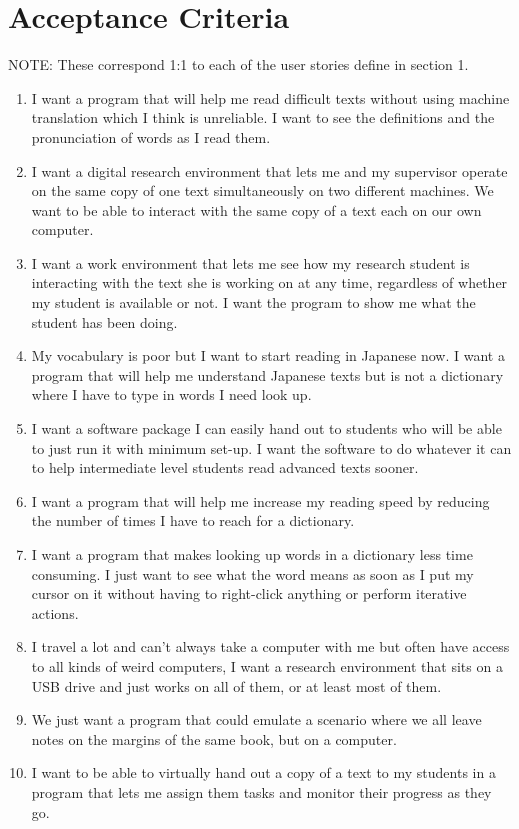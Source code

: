 \documentclass{article}
\begin{document}
\section{Acceptance Criteria}
NOTE: These correspond 1:1 to each of the user stories define in section 1.
\begin{enumerate}
    \item I want a program that will help me read difficult texts without using machine translation which I think is unreliable. I want to see the definitions and the pronunciation of words as I read them.
    \item I want a digital research environment that lets me and my supervisor operate on the same copy of one text simultaneously on two different machines. We want to be able to interact with the same copy of a text each on our own computer.
    \item I want a work environment that lets me see how my research student is interacting with the text she is working on at any time, regardless of whether my student is available or not. I want the program to show me what the student has been doing.
    \item My vocabulary is poor but I want to start reading in Japanese now. I want a program that will help me understand Japanese texts but is not a dictionary where I have to type in words I need look up.
    \item I want a software package I can easily hand out to students who will be able to just run it with minimum set-up. I want the software to do whatever it can to help intermediate level students read advanced texts sooner.
    \item I want a program that will help me increase my reading speed by reducing the number of times I have to reach for a dictionary.
    \item I want a program that makes looking up words in a dictionary less time consuming. I just want to see what the word means as soon as I put my cursor on it without having to right-click anything or perform iterative actions.
    \item I travel a lot and can't always take a computer with me but often have access to all kinds of weird computers, I want a research environment that sits on a USB drive and just works on all of them, or at least most of them.
    \item We just want a program that could emulate a scenario where we all leave notes on the margins of the same book, but on a computer.
    \item I want to be able to virtually hand out a copy of a text to my students in a program that lets me assign them tasks and monitor their progress as they go.
\end{enumerate}
\end{document}
